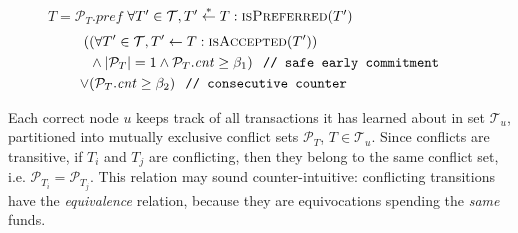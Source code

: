 \begin{figure}[t]
\begin{center}
\small
\begin{algorithmic}[1]
        \State \Return $T = \mathcal{P}_T\mathit{.pref}$
    \EndFunction
        \State \Return $\forall T'\in\mathcal{T}, T' \stackrel{*}{\gets} T: \Call{isPreferred}{T'}$
    \EndFunction
        \State\Return
            \vspace*{-.5\baselineskip}
        \begin{align*}
            (&(\forall T' \in \mathcal{T}, T' \gets T: \Call{isAccepted}{T'}) \\
                &\land |\mathcal{P}_T| = 1 \land \mathcal{P}_T\mathit{.cnt} \ge \beta_1) \texttt{\hspace{.1in}// safe early commitment} \\
            \lor &(%
            \mathcal{P}_T\mathit{.cnt} \ge \beta_2)\texttt{\hspace{.1in}// consecutive counter}
        \end{align*}
    \EndFunction
        \State {}
        \State {}
    \EndProcedure
    \label{fig:gossipchain-onquery}
\end{algorithmic}
\end{center}
\end{figure}

Each correct node $u$
keeps track of all transactions it has learned about in set $\mathcal{T}_u$,
partitioned into mutually exclusive conflict sets $\mathcal{P}_T$, $T \in \mathcal{T}_u$.
Since conflicts are transitive, if $T_i$ and $T_j$ are conflicting, then they belong to the same conflict set, i.e. $\mathcal{P}_{T_i} = \mathcal{P}_{T_j}$. This relation may sound counter-intuitive: conflicting transitions have the \emph{equivalence} relation, because they are equivocations spending the \emph{same} funds.

